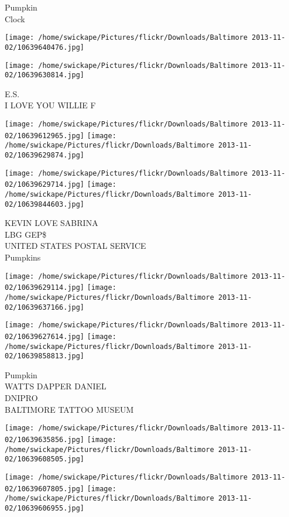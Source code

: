 \documentclass[10pt,letterpaper]{article}
\begin{document}
Pumpkin\\
Clock\\
\pagebreak

\texttt{[image: /home/swickape/Pictures/flickr/Downloads/Baltimore 2013-11-02/10639640476.jpg]}

\vspace{0.25in}
\texttt{[image: /home/swickape/Pictures/flickr/Downloads/Baltimore 2013-11-02/10639630814.jpg]}

E.S.\\
I LOVE YOU WILLIE F\\
\pagebreak

\texttt{[image: /home/swickape/Pictures/flickr/Downloads/Baltimore 2013-11-02/10639612965.jpg]}
\texttt{[image: /home/swickape/Pictures/flickr/Downloads/Baltimore 2013-11-02/10639629874.jpg]}

\texttt{[image: /home/swickape/Pictures/flickr/Downloads/Baltimore 2013-11-02/10639629714.jpg]}
\texttt{[image: /home/swickape/Pictures/flickr/Downloads/Baltimore 2013-11-02/10639844603.jpg]}

KEVIN LOVE SABRINA\\
LBG GEP\$\\
UNITED STATES POSTAL SERVICE\\
Pumpkins\\
\pagebreak

\texttt{[image: /home/swickape/Pictures/flickr/Downloads/Baltimore 2013-11-02/10639629114.jpg]}
\texttt{[image: /home/swickape/Pictures/flickr/Downloads/Baltimore 2013-11-02/10639637166.jpg]}

\texttt{[image: /home/swickape/Pictures/flickr/Downloads/Baltimore 2013-11-02/10639627614.jpg]}
\texttt{[image: /home/swickape/Pictures/flickr/Downloads/Baltimore 2013-11-02/10639858813.jpg]}

Pumpkin\\
WATTS DAPPER DANIEL\\
DNIPRO\\
BALTIMORE TATTOO MUSEUM\\
\pagebreak

\texttt{[image: /home/swickape/Pictures/flickr/Downloads/Baltimore 2013-11-02/10639635856.jpg]}
\texttt{[image: /home/swickape/Pictures/flickr/Downloads/Baltimore 2013-11-02/10639608505.jpg]}

\texttt{[image: /home/swickape/Pictures/flickr/Downloads/Baltimore 2013-11-02/10639607805.jpg]}
\texttt{[image: /home/swickape/Pictures/flickr/Downloads/Baltimore 2013-11-02/10639606955.jpg]}
\end{document}
